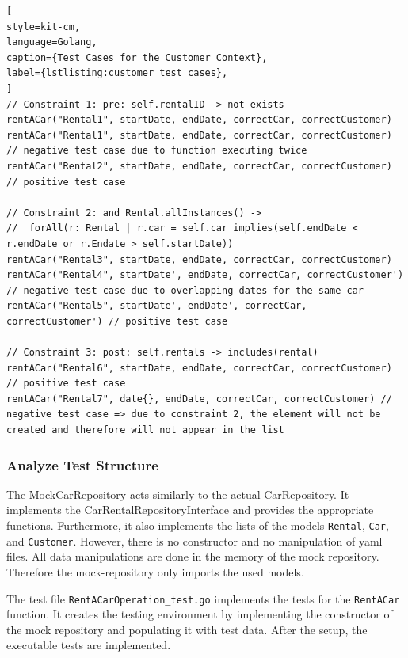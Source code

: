 \begin{lstlisting}[
style=kit-cm,
language=Golang,
caption={Test Cases for the Customer Context},
label={lstlisting:customer_test_cases},
]
// Constraint 1: pre: self.rentalID -> not exists
rentACar("Rental1", startDate, endDate, correctCar, correctCustomer)
rentACar("Rental1", startDate, endDate, correctCar, correctCustomer) // negative test case due to function executing twice
rentACar("Rental2", startDate, endDate, correctCar, correctCustomer) // positive test case

// Constraint 2: and Rental.allInstances() -> 
//  forAll(r: Rental | r.car = self.car implies(self.endDate < r.endDate or r.Endate > self.startDate))
rentACar("Rental3", startDate, endDate, correctCar, correctCustomer)
rentACar("Rental4", startDate', endDate, correctCar, correctCustomer') // negative test case due to overlapping dates for the same car
rentACar("Rental5", startDate', endDate', correctCar, correctCustomer') // positive test case 

// Constraint 3: post: self.rentals -> includes(rental)
rentACar("Rental6", startDate, endDate, correctCar, correctCustomer) // positive test case
rentACar("Rental7", date{}, endDate, correctCar, correctCustomer) // negative test case => due to constraint 2, the element will not be created and therefore will not appear in the list

\end{lstlisting}

\subsubsection*{Analyze Test Structure}
The MockCarRepository acts similarly to the actual CarRepository.
It implements the CarRentalRepositoryInterface and provides the appropriate functions.
Furthermore, it also implements the lists of the models \texttt{Rental}, \texttt{Car}, and \texttt{Customer}.
However, there is no constructor and no manipulation of yaml files.
All data manipulations are done in the memory of the mock repository.
Therefore the mock-repository only imports the used models.

The test file \texttt{RentACarOperation\_test.go} implements the tests for the \texttt{RentACar} function.
It creates the testing environment by implementing the constructor of the mock repository and populating it with test data.
After the setup, the executable tests are implemented.

